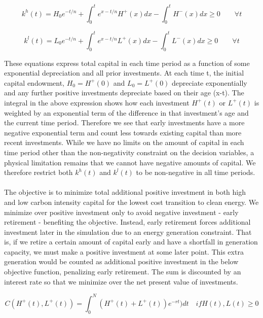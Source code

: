 \documentclass[singlespace]{easychithesis}
\begin{document}
\begin{equation}
k^h(t) = H_0 e^{-t/n} + \int_0^t e^{x-t/n} H^+(x) dx - \int_0^t H^-(x)dx \geq 0 \qquad \forall t
\end{equation}

\begin{equation}
k^l(t) = L_0 e^{-t/n} + \int_0^t e^{x-t/n} L^+(x) dx - \int_0^t L^-(x)dx \geq 0 \qquad \forall t
\end{equation}

These equations express total capital in each time period as a function of some exponential depreciation and all prior investments. At each time t, the initial capital endowment, $H_0 = H^+(0)$ and $L_0 = L^+(0)$ depreciate exponentially and any further positive investments depreciate based on their age (x-t). The integral in the above expression shows how each investment $H^+(t)$ or $L^+(t)$ is weighted by an exponential term of the difference in that investment's age and the current time period. Therefore we see that early investments have a more negative exponential term and count less towards existing capital than more recent investments. While we have no limits on the amount of capital in each time period other than the non-negativity constraint on the decision variables, a physical limitation remains that we cannot have negative amounts of capital. We therefore restrict both $k^h(t)$ and $k^l(t)$ to be non-negative in all time periods. 


\paragraph{} The objective is to minimize total additional positive investment in both high and low carbon intensity capital for the lowest cost transition to clean energy. We minimize over positive investment only to avoid negative investment - early retirement - benefiting the objective. Instead, early retirement forces additional investment later in the simulation due to an energy generation constraint. That is, if we retire a certain amount of capital early and have a shortfall in generation capacity, we must make a positive investment at some later point. This extra generation would be counted as additional positive investment in the below objective function, penalizing early retirement. The sum is discounted by an interest rate so that we minimize over the net present value of investments. 

\begin{equation}
C(H^+(t), L^+(t)) = \int_0^N (H^+(t) + L^+(t))e^{-rt}) dt \quad if H(t), L(t) \geq 0
\end{equation}
\end{document}
